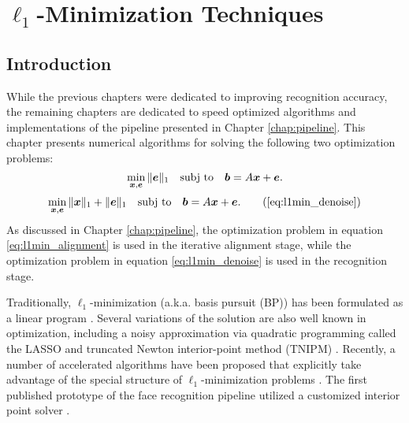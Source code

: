 \chapter{$\ell_1$-Minimization Techniques}
\label{chap:minimization}

\section{Introduction}
While the previous chapters were dedicated to improving recognition accuracy,
the remaining chapters are dedicated to speed optimized
algorithms and implementations of the pipeline presented in Chapter
\ref{chap:pipeline}.  This chapter presents numerical algorithms for solving the following
two optimization problems:
\begin{equation}
\min_{{\boldsymbol{x}}, {\boldsymbol{e}}} \|{\boldsymbol{e}}\|_1 \quad \textup{subj to} \quad \boldsymbol{b} = A {\boldsymbol{x}} + {\boldsymbol{e}}.
\label{eq:l1min_alignment}
\end{equation}
\begin{equation}
\min_{\xx, \ee} \| \xx \|_1 + \|\ee\|_1 \quad \subj \quad \bb = A \xx + \ee.
\tag{\ref{eq:l1min_denoise}}
\end{equation}
As discussed in Chapter \ref{chap:pipeline}, the optimization problem in equation
\ref{eq:l1min_alignment} is used in the iterative alignment stage, while the optimization
problem in equation \ref{eq:l1min_denoise} is used in the recognition stage.

Traditionally, $\ell_1$-minimization (a.k.a.
basis pursuit (BP)) has been formulated as a linear program
\cite{ChenS2001-SIAM}. 
Several variations of the solution are also well known
in optimization, including a noisy approximation via quadratic programming
called the LASSO \cite{TibshiraniR1996} and truncated Newton interior-point
method (TNIPM) \cite{KimS2007}.
Recently, a number of accelerated algorithms have been proposed that
explicitly take advantage of the special structure of $\ell_1$-minimization
problems \cite{LorisI2009,YangA2010-ICIP}. 
The first published prototype of the face recognition pipeline utilized a customized
interior point solver \cite{WagnerA2009-CVPR}.  

